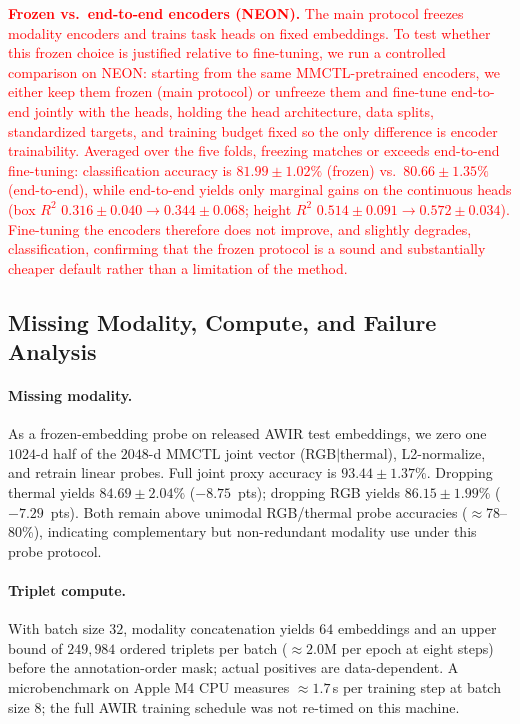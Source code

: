 \documentclass[lettersize,journal]{IEEEtran}
\newcommand{\new}[1]{\textcolor{red}{#1}}
\begin{document}
\new{\noindent\textbf{Frozen vs.\ end-to-end encoders (NEON).}
The main protocol freezes modality encoders and trains task heads on fixed embeddings. To test whether this frozen choice is justified relative to fine-tuning, we run a controlled comparison on NEON: starting from the same MMCTL-pretrained encoders, we either keep them frozen (main protocol) or unfreeze them and fine-tune end-to-end jointly with the heads, holding the head architecture, data splits, standardized targets, and training budget fixed so the only difference is encoder trainability. Averaged over the five folds, freezing matches or exceeds end-to-end fine-tuning: classification accuracy is $81.99\pm1.02\%$ (frozen) vs.\ $80.66\pm1.35\%$ (end-to-end), while end-to-end yields only marginal gains on the continuous heads (box $R^2$ $0.316\pm0.040\rightarrow0.344\pm0.068$; height $R^2$ $0.514\pm0.091\rightarrow0.572\pm0.034$). Fine-tuning the encoders therefore does not improve, and slightly degrades, classification, confirming that the frozen protocol is a sound and substantially cheaper default rather than a limitation of the method.}

\subsection{Missing Modality, Compute, and Failure Analysis}
\label{subsec:additional-analyses}

\paragraph{Missing modality.}
As a frozen-embedding probe on released AWIR test embeddings, we zero one $1024$-d half of the $2048$-d MMCTL joint vector (RGB$|$thermal), L2-normalize, and retrain linear probes. Full joint proxy accuracy is $93.44\pm1.37\%$. Dropping thermal yields $84.69\pm2.04\%$ ($-8.75$~pts); dropping RGB yields $86.15\pm1.99\%$ ($-7.29$~pts). Both remain above unimodal RGB/thermal probe accuracies ($\approx$78--80\%), indicating complementary but non-redundant modality use under this probe protocol.

\paragraph{Triplet compute.}
With batch size $32$, modality concatenation yields $64$ embeddings and an upper bound of $249{,}984$ ordered triplets per batch ($\approx 2.0$M per epoch at eight steps) before the annotation-order mask; actual positives are data-dependent. A microbenchmark on Apple M4 CPU measures $\approx 1.7$\,s per training step at batch size $8$; the full AWIR training schedule was not re-timed on this machine.
\end{document}
